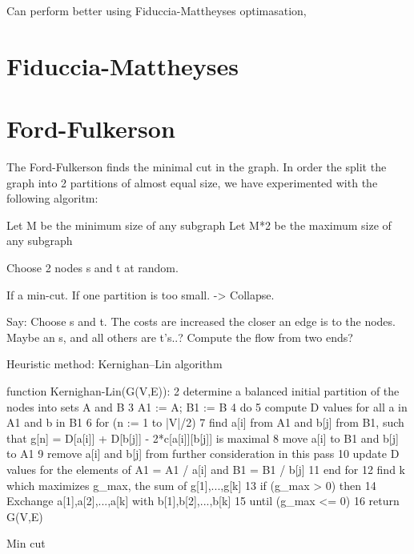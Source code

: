 Can perform better using Fiduccia-Mattheyses optimasation,   

\section{Fiduccia-Mattheyses}
\section{Ford-Fulkerson}
The Ford-Fulkerson finds the minimal cut in the graph. In order the split the graph into 2 partitions of almost equal size, we have experimented with the following algoritm:

Let M be the minimum size of any subgraph
Let M*2 be the maximum size of any subgraph

Choose 2 nodes s and t at random.

If a min-cut. If one partition is too small. -> Collapse.


Say: Choose s and t. The costs are increased the closer an edge is to the
nodes.
Maybe an s, and all others are t's..?
Compute the flow from two ends?

Heuristic method:
Kernighan–Lin algorithm

function Kernighan-Lin(G(V,E)):
 2      determine a balanced initial partition of the nodes into sets A and B
 3      A1 := A; B1 := B
 4      do
 5         compute D values for all a in A1 and b in B1
 6         for (n := 1 to |V|/2)
 7            find a[i] from A1 and b[j] from B1, such that g[n] = D[a[i]] + D[b[j]] - 2*c[a[i]][b[j]] is maximal
 8            move a[i] to B1 and b[j] to A1
 9            remove a[i] and b[j] from further consideration in this pass
 10           update D values for the elements of A1 = A1 / a[i] and B1 = B1 / b[j]
 11        end for
 12        find k which maximizes g_max, the sum of g[1],...,g[k]
 13        if (g_max > 0) then
 14           Exchange a[1],a[2],...,a[k] with b[1],b[2],...,b[k]
 15     until (g_max <= 0)
 16  return G(V,E)

Min cut


